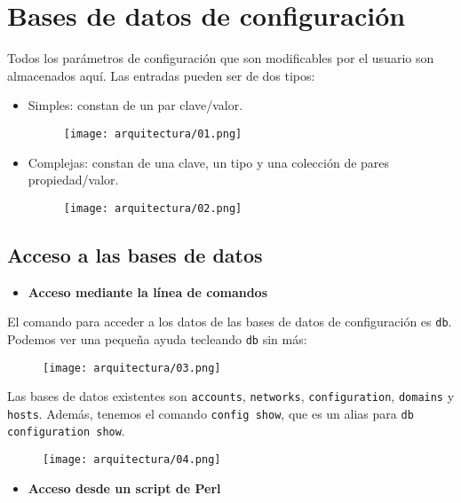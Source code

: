 \section{Bases de datos de configuración}
Todos los parámetros de configuración que son modificables por el usuario son almacenados aquí. Las entradas pueden ser de dos tipos:
\begin{itemize}
\item Simples: constan de un par clave/valor.
\begin{figure}[H]
    \centering
    \texttt{[image: arquitectura/01.png]}
\end{figure}
\item Complejas: constan de una clave, un tipo y una colección de pares propiedad/valor.
\begin{figure}[H]
    \centering
    \texttt{[image: arquitectura/02.png]}
\end{figure}
\end{itemize}

\subsection{Acceso a las bases de datos}

\begin{itemize}
\item \textbf{Acceso mediante la línea de comandos}
\end{itemize}
El comando para acceder a los datos de las bases de datos de configuración es \lstinline!db!. Podemos ver una pequeña ayuda tecleando \lstinline!db! sin más:
\begin{figure}[H]
    \centering
    \texttt{[image: arquitectura/03.png]}
\end{figure}

Las bases de datos existentes son \lstinline!accounts!, \lstinline!networks!, \lstinline!configuration!, \lstinline!domains! y \lstinline!hosts!. Además, tenemos el comando \lstinline!config show!, que es un alias para \lstinline!db configuration show!.

\begin{figure}[H]
    \centering
    \texttt{[image: arquitectura/04.png]}
\end{figure}

\begin{itemize}
\item \textbf{Acceso desde un script de Perl}
\end{itemize}

